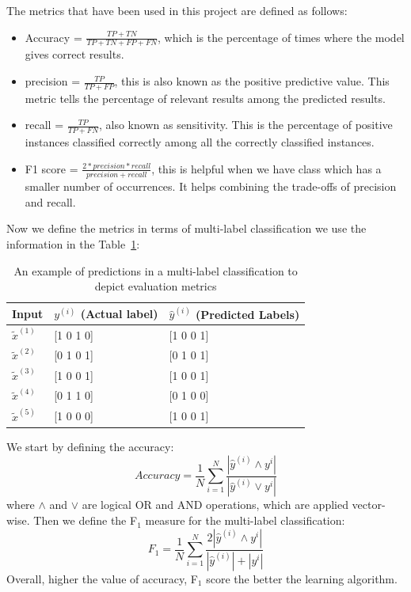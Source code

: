 The metrics that have been used in this project are defined as follows: 
\begin{itemize}
    \item Accuracy = $\frac{TP+TN}{TP + TN + FP + FN}$, which is the percentage of times where the model gives correct results. 
    \item precision = $\frac{TP}{TP + FP}$, this is also known as the positive predictive value. This metric tells the percentage of relevant results among the predicted results. 
    \item recall = $\frac{TP}{TP + FN}$, also known as sensitivity. This is the percentage of positive instances classified correctly among all the correctly classified instances. 
    \item F1 score = $\frac{2*precision*recall}{precision + recall}$, this is helpful when we have class which has a smaller number of occurrences. It helps combining the trade-offs of precision and recall. 
\end{itemize}

Now we define the metrics in terms of multi-label classification we use the information in the Table~\ref{tab:multilabelmetrics}:

\begin{table}[!htb]
    \centering
    \begin{tabular}{|l|l|l|}
\hline
Input & $y^{(i)}$ (Actual label) & $\hat{y}^{(i)}$ (Predicted Labels) \\ \hline
$\tilde{x}^{(1)}$ & [1 0 1 0] & [1 0 0 1] \\ \hline
$\tilde{x}^{(2)}$ & [0 1 0 1] & [0 1 0 1] \\ \hline
$\tilde{x}^{(3)}$ & [1 0 0 1] & [1 0 0 1] \\ \hline
$\tilde{x}^{(4)}$ & [0 1 1 0] & [0 1 0 0] \\ \hline
$\tilde{x}^{(5)}$ & [1 0 0 0] & [1 0 0 1] \\ \hline
\end{tabular}
    \caption{An example of predictions in a multi-label classification to depict evaluation metrics}
    \label{tab:multilabelmetrics}
\end{table}

We start by defining the accuracy:
    \begin{equation}
      Accuracy = \frac{1}{N}\sum_{i=1}^N\frac{|\hat{y}^{(i)} \wedge y^{i}|}{|\hat{y}^{(i)} \vee y^{i}|}
    \end{equation}    
where $\wedge$ and $\vee$ are logical OR and AND operations, which are applied vector-wise. 
Then we define the F$_1$ measure for the multi-label classification:
\begin{equation}
    F_1 = \frac{1}{N}\sum_{i=1}^N\frac{2|\hat{y}^{(i)} \wedge y^{i}|}{|\hat{y}^{(i)}| + |y^{i}|}
\end{equation}
Overall, higher the value of accuracy, F$_1$ score the better the learning algorithm. 

